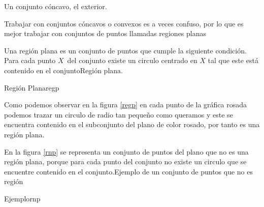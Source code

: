 \documentclass[12pt]{book}
\begin{document}
\begin{definicion}
\begin{ejemplo}
{\begin{lista}
\item Un conjunto c\'{o}ncavo, el exterior.
\end{lista}
}
\end{ejemplo}
Trabajar con conjuntos c\'oncavos o convexos es a veces confuso, por lo que es mejor trabajar con conjuntos de puntos llamadas regiones planas
\begin{definicion}{Una regi\'on plana es un conjunto de puntos que cumple la siguiente condici\'on. Para cada punto $X$\ del conjunto existe un circulo centrado en $X$ tal que este est\'a contenido en el conjunto}{Regi\'on plana.}
 \begin{figura}{
 }{Regi\'on Plana}{regp}
 \end{figura}
 Como podemos observar en la figura \ref{regp} en cada punto de la gráfica rosada podemos trazar un circulo de radio tan pequeño como queramos y este se encuentra contenido en el subconjunto del plano de color rosado, por tanto es una región plana.
 \end{definicion}  
 \begin{ejemplo}{En la figura \ref{rnp} se representa un conjunto de puntos del plano que no es una región plana, porque para cada punto del conjunto no existe un circulo que se encuentre contenido en el conjunto.}{Ejemplo de un conjunto de puntos que no es región}
 \begin{figura}
 {
 }{Ejemplo}{rnp}
 \end{figura}
 

\end{ejemplo}
\end{definicion}
\end{document}
